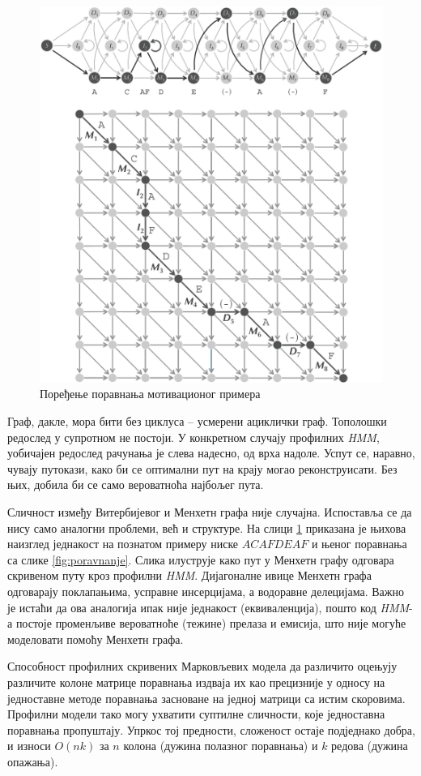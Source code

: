 \documentclass[12pt,oneside]{memoir}
\begin{document}
\begin{CJK}{UTF8}{ipxm}
\begin{figure}[H]
  \centering
  \includegraphics[width=.85\textwidth]{poravnanje2.png}
  \caption{Поређење поравнања мотивационог примера \cite{compeau2015}}
  \label{fig:poravnanje2}
\end{figure}

Граф, дакле, мора бити без циклуса -- усмерени ациклички граф. Тополошки редослед у супротном не постоји. У конкретном случају профилних \textit{HMM}, уобичајен редослед рачунања је слева надесно, од врха надоле. Успут се, наравно, чувају путокази, како би се оптимални пут на крају могао реконструисати. Без њих, добила би се само вероватноћа најбољег пута.

Сличност између Витербијевог и Менхетн графа није случајна. Испоставља се да нису само аналогни проблеми, већ и структуре. На слици \ref{fig:poravnanje2} приказана је њихова наизглед једнакост на познатом примеру ниске $ACAFDEAF$ и њеног поравнања са слике \ref{fig:poravnanje}. Слика илуструје како пут у Менхетн графу одговара скривеном путу кроз профилни \textit{HMM}. Дијагоналне ивице Менхетн графа одговарају поклапањима, усправне инсерцијама, а водоравне делецијама. Важно је истаћи да ова аналогија ипак није једнакост (еквиваленција), пошто код \textit{HMM}-а постоје променљиве вероватноће (тежине) прелаза и емисија, што није могуће моделовати помоћу Менхетн графа.

Способност профилних скривених Марковљевих модела да различито оцењују различите колоне матрице поравнања издваја их као прецизније у односу на једноставне методе поравнања засноване на једној матрици са истим скоровима. Профилни модели тако могу ухватити суптилне сличности, које једноставна поравнања пропуштају. Упркос тој предности, сложеност остаје подједнако добра, и износи $O(nk)$ за $n$ колона (дужина полазног поравнања) и $k$ редова (дужина опажања).


\end{CJK}
\end{document}
